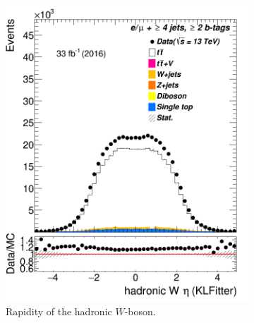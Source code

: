 \begin{figure}
\begin{subfigure}{0.25\textwidth}
		\includegraphics[width=\linewidth]{ControlPlots_emujets_2016_4incl_2incl/klf_Whad_eta_emujets_2016.png}
		\caption{Rapidity of the hadronic $W$-boson.} \label{fig:K22}
	\end{subfigure}	\hspace*{0.5cm}
\begin{subfigure}{0.25\textwidth}

\end{subfigure}
\end{figure}
